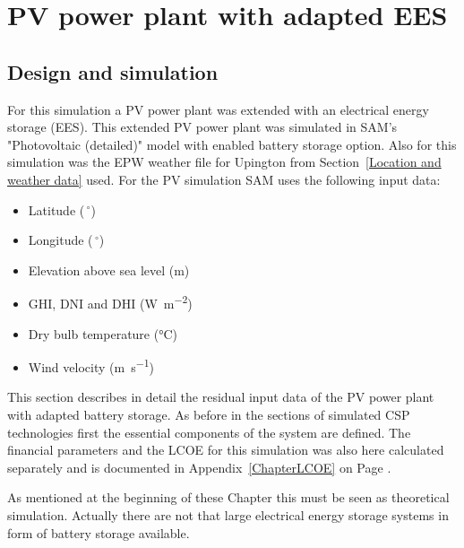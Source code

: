 \chapter{PV power plant with adapted EES}
\section{Design and simulation} \label{section PV system}
For this simulation a PV power plant was extended with an electrical energy storage (EES). This extended PV power plant was simulated in SAM's "Photovoltaic (detailed)" model with enabled battery storage option. Also for this simulation was the EPW weather file for Upington from Section~\ref{Location and weather data} used. For the PV simulation SAM uses the following input data:
\begin{itemize}
\item Latitude ($\,^{\circ}$)
\item Longitude ($\,^{\circ}$)
\item Elevation above sea level (\si{\metre})
\item GHI, DNI and DHI (\si{\watt\per\square\metre})
\item Dry bulb temperature (\si{\celsius})
\item Wind velocity (\si{\metre\per\second})
\end{itemize}
This section describes in detail the residual input data of the PV power plant with adapted battery storage. As before in the sections of simulated CSP technologies first the essential components of the system are defined. The financial parameters and the LCOE for this simulation was also here calculated separately and is documented in Appendix~\ref{ChapterLCOE} on Page \pageref{ChapterLCOE}.



As mentioned at the beginning of these Chapter this must be seen as theoretical simulation. Actually there are not that large electrical energy storage systems in form of battery storage available.



